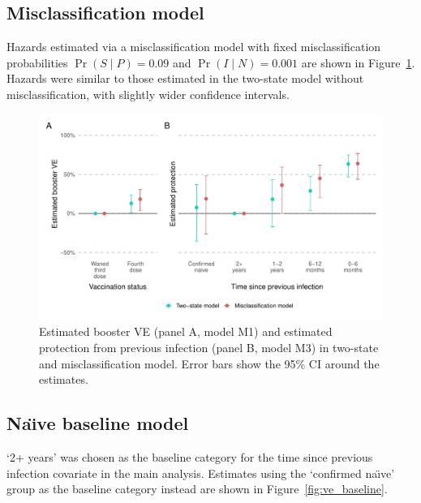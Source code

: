 \subsection{Misclassification model}

Hazards estimated via a misclassification model with fixed misclassification probabilities $\Pr(S \mid P) = 0.09$ and $\Pr(I \mid N) = 0.001$ are shown in Figure~\ref{fig:ve_misclass}. Hazards were similar to those estimated in the two-state model without misclassification, with slightly wider confidence intervals.

\begin{figure}[htbp!]
    \centering
    \includegraphics[width=\textwidth]{ve_misclass.pdf}
    \caption[Estimated booster VE and estimated protection from previous infection in two-state and misclassification model]{Estimated booster VE (panel A, model M1) and estimated protection from previous infection (panel B, model M3) in two-state and misclassification model. Error bars show the 95\% CI around the estimates.}\label{fig:ve_misclass}
\end{figure}

\subsection{Na\"{\i}ve baseline model}

`2+ years' was chosen as the baseline category for the time since previous infection covariate in the main analysis. Estimates using the `confirmed na\"{\i}ve' group as the baseline category instead are shown in Figure~\ref{fig:ve_baseline}.

